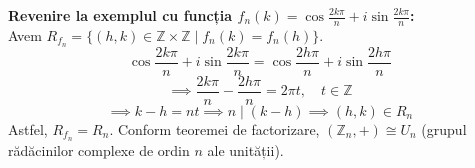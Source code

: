 \vspace{1em}
\textbf{Revenire la exemplul cu funcția $f_n(k) = \cos \frac{2k\pi}{n} + i \sin \frac{2k\pi}{n}$:} \\
Avem $R_{f_n} = \{(h,k) \in \mathbb{Z} \times \mathbb{Z} \mid f_n(k) = f_n(h)\}$.
$$ \cos \frac{2k\pi}{n} + i \sin \frac{2k\pi}{n} = \cos \frac{2h\pi}{n} + i \sin \frac{2h\pi}{n} $$
$$ \implies \frac{2k\pi}{n} - \frac{2h\pi}{n} = 2\pi t, \quad t \in \mathbb{Z} $$
$$ \implies k - h = nt \implies n \mid (k - h) \implies (h,k) \in R_n $$
Astfel, $R_{f_n} = R_n$. Conform teoremei de factorizare, $(\mathbb{Z}_n, +) \cong U_n$ (grupul rădăcinilor complexe de ordin $n$ ale unității).